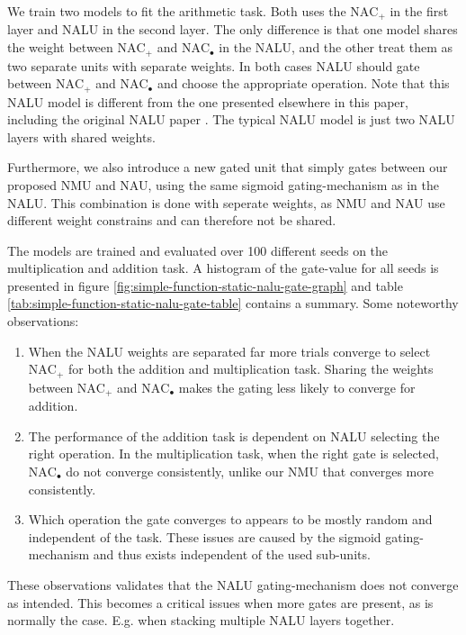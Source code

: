 We train two models to fit the arithmetic task. Both uses the $\mathrm{NAC}_{+}$ in the first layer and NALU in the second layer. The only difference is that one model shares the weight between $\mathrm{NAC}_{+}$ and $\mathrm{NAC}_{\bullet}$ in the NALU, and the other treat them as two separate units with separate weights. In both cases NALU should gate between $\mathrm{NAC}_{+}$ and $\mathrm{NAC}_{\bullet}$ and choose the appropriate operation. Note that this NALU model is different from the one presented elsewhere in this paper, including the original NALU paper \cite{trask-nalu}. The typical NALU model is just two NALU layers with shared weights.

Furthermore, we also introduce a new gated unit that simply gates between our proposed NMU and NAU, using the same sigmoid gating-mechanism as in the NALU. This combination is done with seperate weights, as NMU and NAU use different weight constrains and can therefore not be shared.

The models are trained and evaluated over 100 different seeds on the multiplication and addition task. A histogram of the gate-value for all seeds is presented in figure \ref{fig:simple-function-static-nalu-gate-graph} and table \ref{tab:simple-function-static-nalu-gate-table} contains a summary. Some noteworthy observations:

\vspace{-0.3cm}\begin{enumerate}
    \item When the NALU weights are separated far more trials converge to select $\mathrm{NAC}_{+}$ for both the addition and multiplication task. Sharing the weights between $\mathrm{NAC}_{+}$ and $\mathrm{NAC}_{\bullet}$ makes the gating less likely to converge for addition.
    \item The performance of the addition task is dependent on NALU selecting the right operation. In the multiplication task, when the right gate is selected, $\mathrm{NAC}_{\bullet}$ do not converge consistently, unlike our NMU that converges more consistently.
    \item Which operation the gate converges to appears to be mostly random and independent of the task. These issues are caused by the sigmoid gating-mechanism and thus exists independent of the used sub-units.
\end{enumerate}

\vspace{-0.2cm}These observations validates that the NALU gating-mechanism does not converge as intended. This becomes a critical issues when more gates are present, as is normally the case. E.g. when stacking multiple NALU layers together.

